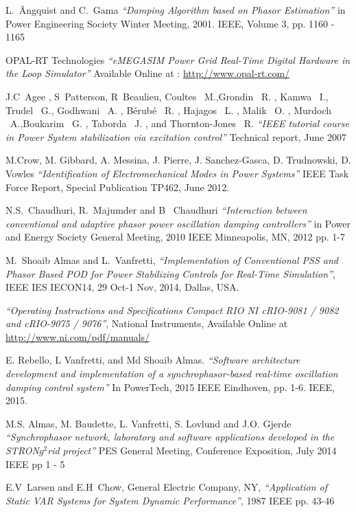 \documentclass{ieeeaccess}
\begin{document}
\begin{thebibliography}{00}
L.~\"{A}ngquist and C.~Gama  \emph{``Damping Algorithm based on Phasor Estimation''} in Power Engineering Society Winter Meeting, 2001. IEEE, Volume 3, pp. 1160 - 1165  

OPAL-RT Technologies \emph{``eMEGASIM Power Grid Real-Time Digital Hardware in the Loop Simulator''} Available Online at : \underline{http://www.opal-rt.com/}

 J.C~Agee , S~Patterson, R~Beaulieu, Coultes \ M.,Grondin \ R. , Kamwa \ I.,
Trudel \ G., Godhwani \ A. , Bérubé \ R. , Hajagos \ L. , Malik \ O. , Murdoch \ A.,Boukarim \ G. , Taborda \ J. , and Thornton-Jones \ R. \emph{``IEEE tutorial course in Power System stabilization via excitation control''} Technical report, June 2007


 M.Crow, M. Gibbard, A. Messina, J. Pierre, J. Sanchez-Gasca, D. Trudnowski, D. Vowles \emph{``Identification of Electromechanical Modes in Power Systems''} IEEE Task Force Report, Special Publication TP462, June 2012.

 N.S.~Chaudhuri, R.~Majumder and B~ Chaudhuri \emph{``Interaction between conventional and adaptive phasor power oscillation damping controllers''} in Power and Energy Society General Meeting, 2010 IEEE Minneapolis, MN, 2012 pp. 1-7
  
 M.~Shoaib Almas and L.~Vanfretti, \emph{``Implementation of Conventional PSS and Phasor Based POD for Power Stabilizing Controls for Real-Time Simulation''}, IEEE IES IECON14, 29 Oct-1 Nov, 2014, Dallas, USA.

 \emph{``Operating Instructions and Specifications Compact RIO NI cRIO-9081 / 9082 and cRIO-9075 / 9076''}, National Instruments, Available Online at \underline{http://www.ni.com/pdf/manuals/}

E. Rebello, L Vanfretti, and Md Shoaib Almas. \emph{``Software architecture development and implementation of a synchrophasor-based real-time oscillation damping control system''} In PowerTech, 2015 IEEE Eindhoven, pp. 1-6. IEEE, 2015.

 M.S. Almas, M. Baudette, L. Vanfretti, S. Lovlund and J.O. Gjerde \emph{``Synchrophasor network, laboratory and software applications developed in the STRON$g^{2}$rid project''} PES General Meeting, Conference Exposition, July 2014 IEEE pp 1 - 5

 E.V~Larsen and E.H~Chow, General Electric Company, NY, \emph{``Application of Static VAR Systems for System Dynamic Performance''}, 1987 IEEE pp. 43-46


\end{thebibliography}
\end{document}
